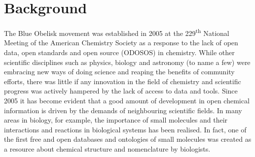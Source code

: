 \documentclass[10pt]{bmc_article}
\newenvironment{bmcformat}{\fussy\setboolean{publ}{true}}{\fussy}
\begin{document}
\begin{bmcformat}




\section*{Background}
The Blue Obelisk movement was established in 2005 at the
229\textsuperscript{th} National Meeting of the American Chemistry
Society as a response to the lack of open data, open standards and
open source (ODOSOS) in chemistry. While other scientific disciplines
such as physics, biology and astronomy (to name a few) were embracing
new ways of doing science and reaping the benefits of community
efforts, there was little if any innovation in the field of chemistry
and scientific progress was actively hampered by the lack of access to
data and tools.
Since 2005 it has become evident that a good amount of development in open
chemical information is driven by the demands of neighbouring
scientific fields. In many areas in biology, for example, the importance of
small molecules and their interactions and reactions in biological systems
has been realised. In fact, one of the first free and open databases and ontologies
of small molecules was created as a resource about chemical structure and nomenclature
by biologists.\cite{DeMatos:2009p3839}


\end{bmcformat}
\end{document}
